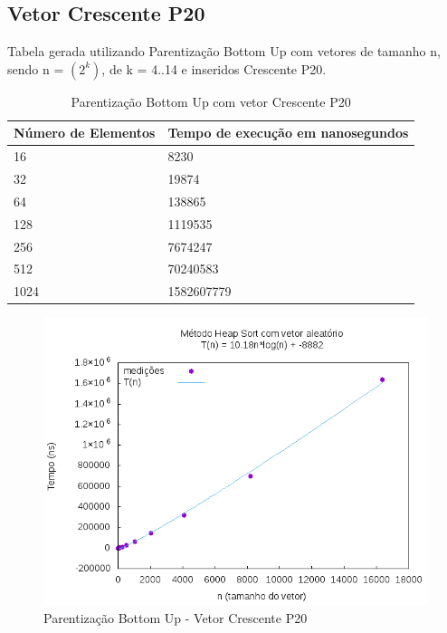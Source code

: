 \documentclass[12pt,a4paper,twoside]{report}
\begin{document}
\subsection{Vetor Crescente P20}
Tabela gerada utilizando Parentização Bottom Up com vetores de tamanho n, sendo n = $(2^k)$, de k = 4..14 e inseridos Crescente P20.
\begin{table}[H]
\centering
\caption{Parentização Bottom Up com vetor Crescente P20}
\label{my-label}
\begin{tabular}{|l|l|}
\hline
\multicolumn{1}{|c|}{\textbf{Número de Elementos}} & \multicolumn{1}{c|}{\textbf{Tempo de execução em nanosegundos}} \\ \hline
16 & 8230 \\ \hline
32 & 19874 \\ \hline
64 & 138865 \\ \hline
128 & 1119535 \\ \hline
256 & 7674247 \\ \hline
512 & 70240583 \\ \hline
1024 & 1582607779 \\ \hline
\end{tabular}
\end{table}

\begin{figure}[H]
    \centering
    \includegraphics[width=0.7\linewidth]{graficos/HeapSort/vIntAleatorio/vIntAleatorio.png}
  \caption{Parentização Bottom Up - Vetor Crescente P20}
\end{figure}
\end{document}
